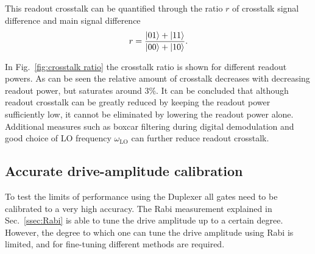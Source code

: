           This readout crosstalk can be quantified through the ratio $r$ of crosstalk signal difference and main signal difference
          \begin{equation}
            r=\frac{\ket{01}+\ket{11}}{\ket{00} + \ket{10}}.
            \label{eq:crosstalk ratio}
          \end{equation}

          In Fig.~\ref{fig:crosstalk ratio} the crosstalk ratio is shown for different readout powers. As can be seen the relative amount of crosstalk decreases with decreasing readout power, but saturates around $3\%$. It can be concluded that although readout crosstalk can be greatly reduced by keeping the readout power sufficiently low, it cannot be eliminated by lowering the readout power alone. Additional measures such as boxcar filtering during digital demodulation and good choice of LO frequency $\omega_\text{LO}$ can further reduce readout crosstalk.

      \subsection{Accurate drive-amplitude calibration}
        \label{ssec:PiX360}
        To test the limits of performance using the Duplexer all gates need to be calibrated to a very high accuracy. The Rabi measurement explained in Sec.~\ref{ssec:Rabi} is able to tune the drive amplitude up to a certain degree. However, the degree to which one can tune the drive amplitude using Rabi is limited, and for fine-tuning different methods are required.


